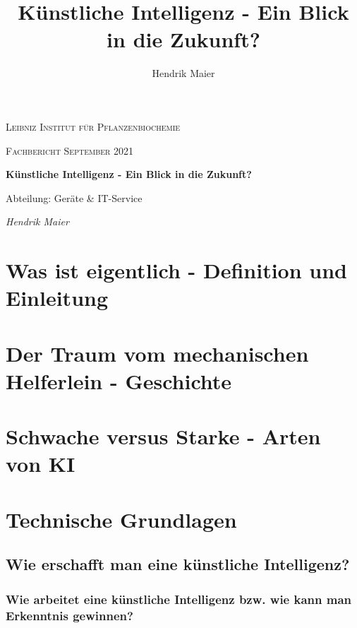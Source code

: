 \documentclass[12pt,german,ngerman]{report}
\title{Künstliche Intelligenz - Ein Blick in die Zukunft?}
\author{Hendrik Maier}
\date{}
\begin{document}
    \begin{titlepage}
        \centering
        {\scshape\LARGE Leibniz Institut für Pflanzenbiochemie\par}
        \vspace{1cm}
        {\scshape\Large Fachbericht September 2021\par}
        \vspace{1.5cm}
        {\huge\bfseries Künstliche Intelligenz - Ein Blick in die Zukunft?\par}
        \vspace{2cm}
        {\Large Abteilung: Geräte \& IT-Service\par}
        \vspace{1.5cm}
        {\Large\itshape Hendrik Maier\par}
        \vfill

    \end{titlepage}

    \tableofcontents
    \newpage

\chapter{Was ist eigentlich  - Definition und Einleitung}

\chapter{Der Traum vom mechanischen Helferlein - Geschichte}

\chapter{Schwache versus Starke - Arten von KI}


\chapter{Technische Grundlagen}
    \section{Wie erschafft man eine künstliche Intelligenz?}
        \subsection{Wie arbeitet eine künstliche Intelligenz bzw. wie kann man Erkenntnis gewinnen?}
\end{document}
